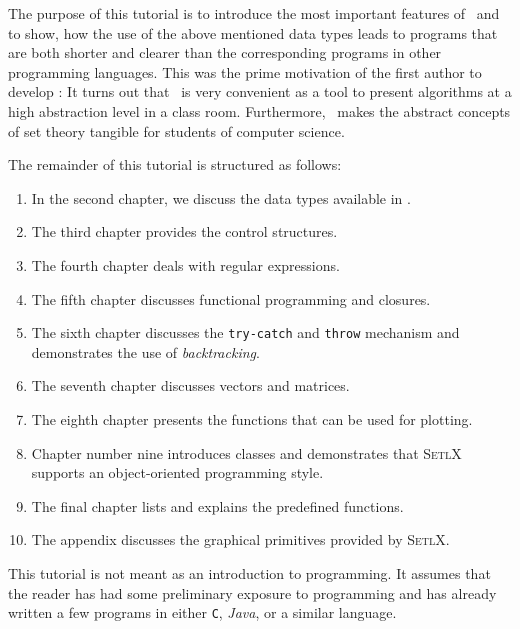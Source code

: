 The purpose of this tutorial is to introduce the most important features of \setlx\ and to
show, how the use of the above mentioned data types leads to programs that are both shorter
and clearer than the corresponding programs in other programming languages.  This was the
prime motivation of the first author to develop \setlx:  It turns out that \setlx\ is very
convenient as a tool to present algorithms at a high abstraction level in a class room. 
Furthermore, \setlx\ makes the abstract concepts of set theory tangible for students of
computer science. 
\pagebreak

\noindent 
The remainder
of this tutorial is structured as follows:
\begin{enumerate}
\item In the second chapter, we discuss the data types available in \setlx.
\item The third chapter provides the control structures.
\item The fourth chapter deals with regular expressions.
\item The fifth chapter discusses functional programming and closures.
\item The sixth chapter discusses the \texttt{try-}\texttt{catch} and \texttt{throw}
      mechanism and demonstrates the use of \emph{backtracking}.
\item The seventh chapter discusses vectors and matrices.
\item The eighth chapter presents the functions that can be used for plotting.
\item Chapter number nine introduces classes and demonstrates that \textsc{SetlX}
         supports an object-oriented programming style.
\item The final chapter lists and explains the predefined functions.
\item The appendix discusses the graphical primitives provided by \textsc{SetlX}.
\end{enumerate}
This tutorial is not meant as an introduction to programming.  It assumes that the reader
has had some preliminary exposure to programming and has already written a few programs in
either \texttt{C}, \textsl{Java}, or a similar language.

